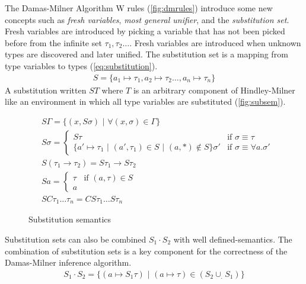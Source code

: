 \documentclass[11pt,oneside,a4paper]{report}
\begin{document}
The Damas-Milner Algorithm W rules (\autoref{fig:dmrules}) introduce some new concepts such as \textit{fresh variables}, \textit{most general unifier}, and the \textit{substitution set}.
Fresh variables are introduced by picking a variable that has not been picked before from the infinite set $\tau_1, \tau_2 \dots $.
Fresh variables are introduced when unknown types are discovered and later unified.
The substitution set is a mapping from type variables to types (\autoref{eq:substitution}).
\begin{align}
    S = \{ a_1 \mapsto \tau_1, a_2 \mapsto \tau_2 \dots , a_n \mapsto \tau_n \} 
    \label{eq:substitution}
\end{align}
A substitution written $S T$ where $T$ is an arbitrary component of Hindley-Milner like an environment in which all type variables are substituted (\autoref{fig:subsem}).
\begin{figure}
\begin{mdframed}
\begin{align}
    &S \Gamma = \{ (x, S \sigma) \,\,|\,\, \forall (x, \sigma) \in \Gamma \} \tag{Environment}\\
    &S \sigma  = 
        \begin{cases}
            S \tau & \text{if } \sigma \equiv \tau\\
            \{ a' \mapsto \tau_1 \,\,|\,\, (a', \tau_1) \in S \,\,|\,\, (a, *) \notin S \} \sigma' & \text{if } \sigma \equiv \forall a . \sigma'
        \end{cases}
    \tag{Poly}\\
    &S (\tau_1 \rightarrow \tau_2) = S\tau_1 \rightarrow S\tau_2 \tag{Arrow}\\
    &S a = 
        \begin{cases}
            \tau & \text{if } (a, \tau) \in S\\
            a & 
        \end{cases}
    \tag{Typevariable}\\
    &S C \tau_1 \dots \tau_n = C S\tau_1 \dots S\tau_n \tag{Constructor}
\end{align}
\end{mdframed}
    \caption{Substitution semantics}
    \label{fig:subsem}
\end{figure}
Substitution sets can also be combined $S_1 \cdot S_2$ with well defined-semantics.
The combination of substitution sets is a key component for the correctness of the Damas-Milner inference algorithm.
\begin{align}
    S_1 \cdot S_2 = \{ (a \mapsto S_1\tau) \,\,|\,\, (a \mapsto \tau) \in (S_2 \cup_. S_1) \}
    \label{eq:combination}
\end{align}
\end{document}
